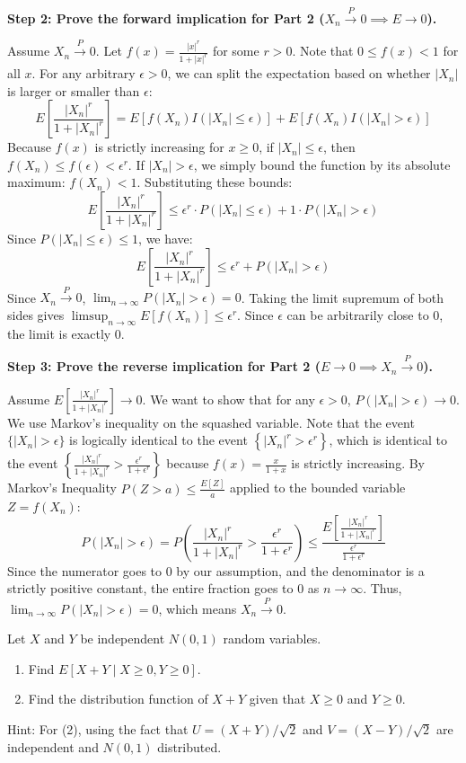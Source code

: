 \begin{solution}
\textbf{Step 2: Prove the forward implication for Part 2 ($X_n \xrightarrow{P} 0 \implies E \to 0$).}

Assume $X_n \xrightarrow{P} 0$. Let $f(x) = \frac{|x|^r}{1+|x|^r}$ for some $r > 0$. Note that $0 \leq f(x) < 1$ for all $x$.
For any arbitrary $\epsilon > 0$, we can split the expectation based on whether $|X_n|$ is larger or smaller than $\epsilon$:
\[ E\left[\frac{|X_n|^r}{1+|X_n|^r}\right] = E[f(X_n) I(|X_n| \leq \epsilon)] + E[f(X_n) I(|X_n| > \epsilon)] \]
Because $f(x)$ is strictly increasing for $x \geq 0$, if $|X_n| \leq \epsilon$, then $f(X_n) \leq f(\epsilon) < \epsilon^r$.
If $|X_n| > \epsilon$, we simply bound the function by its absolute maximum: $f(X_n) < 1$.
Substituting these bounds:
\[ E\left[\frac{|X_n|^r}{1+|X_n|^r}\right] \leq \epsilon^r \cdot P(|X_n| \leq \epsilon) + 1 \cdot P(|X_n| > \epsilon) \]
Since $P(|X_n| \leq \epsilon) \leq 1$, we have:
\[ E\left[\frac{|X_n|^r}{1+|X_n|^r}\right] \leq \epsilon^r + P(|X_n| > \epsilon) \]
Since $X_n \xrightarrow{P} 0$, $\lim_{n \to \infty} P(|X_n| > \epsilon) = 0$.
Taking the limit supremum of both sides gives $\limsup_{n \to \infty} E[f(X_n)] \leq \epsilon^r$.
Since $\epsilon$ can be arbitrarily close to 0, the limit is exactly 0.

\textbf{Step 3: Prove the reverse implication for Part 2 ($E \to 0 \implies X_n \xrightarrow{P} 0$).}

Assume $E\left[\frac{|X_n|^r}{1+|X_n|^r}\right] \to 0$. We want to show that for any $\epsilon > 0$, $P(|X_n| > \epsilon) \to 0$.
We use Markov's inequality on the squashed variable. Note that the event $\{|X_n| > \epsilon\}$ is logically identical to the event $\left\{ |X_n|^r > \epsilon^r \right\}$, which is identical to the event $\left\{ \frac{|X_n|^r}{1+|X_n|^r} > \frac{\epsilon^r}{1+\epsilon^r} \right\}$ because $f(x) = \frac{x}{1+x}$ is strictly increasing.
By Markov's Inequality $P(Z > a) \leq \frac{E[Z]}{a}$ applied to the bounded variable $Z = f(X_n)$:
\[ P(|X_n| > \epsilon) = P\left( \frac{|X_n|^r}{1+|X_n|^r} > \frac{\epsilon^r}{1+\epsilon^r} \right) \leq \frac{E\left[\frac{|X_n|^r}{1+|X_n|^r}\right]}{\frac{\epsilon^r}{1+\epsilon^r}} \]
Since the numerator goes to 0 by our assumption, and the denominator is a strictly positive constant, the entire fraction goes to 0 as $n \to \infty$.
Thus, $\lim_{n \to \infty} P(|X_n| > \epsilon) = 0$, which means $X_n \xrightarrow{P} 0$.
\end{solution}

\begin{exercise}
\label{probability:2013:2}
Let $X$ and $Y$ be independent $N(0,1)$ random variables.
\begin{enumerate}
    \item Find $E[X+Y \mid X \geq 0, Y \geq 0]$.
    \item Find the distribution function of $X+Y$ given that $X \geq 0$ and $Y \geq 0$.
\end{enumerate}
Hint: For (2), using the fact that $U = (X+Y)/\sqrt{2}$ and $V = (X-Y)/\sqrt{2}$ are independent and $N(0,1)$ distributed.
\end{exercise}

